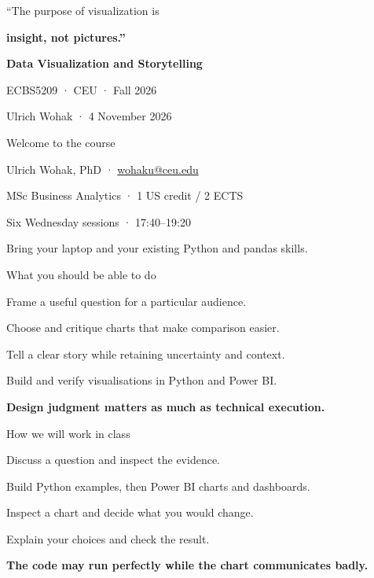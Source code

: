 \documentclass[aspectratio=169,11pt]{beamer}
\newcommand{\point}[1]{\par\vspace{4mm}#1\par}
\newcommand{\takeaway}[1]{\par\vfill\textcolor{accent}{\textbf{#1}}\par\vspace{2mm}}
\begin{document}
\begin{frame}
\vspace{7mm}
{\LARGE “The purpose of visualization is\par}
\vspace{3mm}
{\huge\bfseries\color{accent} insight, not pictures.”\par}
\vfill
{\Large\bfseries Data Visualization and Storytelling\par}
\vspace{4mm}
ECBS5209 · CEU · Fall 2026\par
Ulrich Wohak · 4 November 2026\par\vspace{4mm}
\end{frame}

\begin{frame}{Welcome to the course}
\point{Ulrich Wohak, PhD · \href{mailto:wohaku@ceu.edu}{wohaku@ceu.edu}}
\point{MSc Business Analytics · 1 US credit / 2 ECTS}
\point{Six Wednesday sessions · 17:40–19:20}
\point{Bring your laptop and your existing Python and pandas skills.}
\end{frame}

\begin{frame}{What you should be able to do}
\point{Frame a useful question for a particular audience.}
\point{Choose and critique charts that make comparison easier.}
\point{Tell a clear story while retaining uncertainty and context.}
\point{Build and verify visualisations in Python and Power BI.}
\takeaway{Design judgment matters as much as technical execution.}
\end{frame}

\begin{frame}{How we will work in class}
\point{Discuss a question and inspect the evidence.}
\point{Build Python examples, then Power BI charts and dashboards.}
\point{Inspect a chart and decide what you would change.}
\point{Explain your choices and check the result.}
\takeaway{The code may run perfectly while the chart communicates badly.}
\end{frame}
\end{document}

